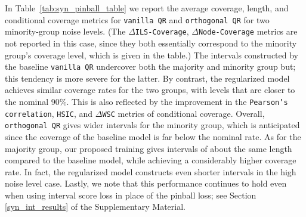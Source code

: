 \documentclass{article}
\begin{document}
In Table~\ref{tab:syn_pinball_table} we report the average coverage, length, and conditional coverage metrics for \texttt{vanilla QR} and \texttt{orthogonal QR} for two minority-group noise levels. (The $\Delta$\texttt{ILS-Coverage}, $\Delta$\texttt{Node-Coverage} metrics are not reported in this case, since they both essentially correspond to the minority group's coverage level, which is given in the table.) The intervals constructed by the baseline \texttt{vanilla QR} undercover both the majority and minority group but; this tendency is more severe for the latter. By contrast, the regularized model achieves similar coverage rates for the two groups, with levels that are closer to the nominal 90\%. This is also reflected by the improvement in the \texttt{Pearson's correlation}, \texttt{HSIC}, and $\Delta$\texttt{WSC} metrics of conditional coverage. Overall, \texttt{orthogonal QR} gives wider intervals for the minority group, which is anticipated since the coverage of the baseline model is far below the nominal rate. As for the majority group, our proposed training gives intervals of about the same length compared to the baseline model, while achieving a considerably higher coverage rate. In fact, the regularized model constructs even shorter intervals in the high noise level case. Lastly, we note that this performance continues to hold even when using interval score loss in place of the pinball loss; see Section \ref{syn_int_results} of the Supplementary Material.
\end{document}
